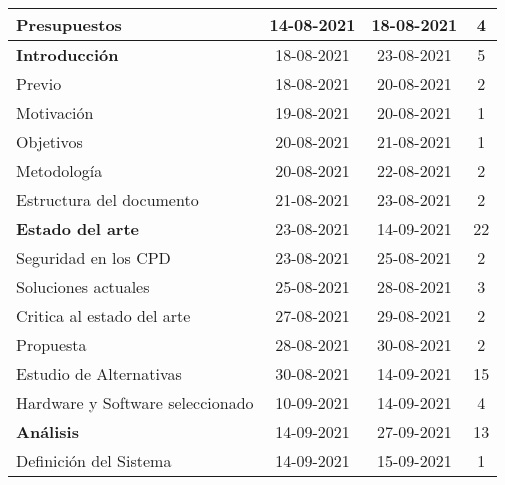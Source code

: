 \begin{longtable}[c]{lcc|c|}
	\multicolumn{1}{|l|}{Presupuestos}                       & \multicolumn{1}{c|}{14-08-2021} & 18-08-2021     & 4   \\ \hline
	\multicolumn{1}{|l|}{\textbf{Introducción}}              & \multicolumn{1}{c|}{18-08-2021} & 23-08-2021     & 5   \\ \hline
	\multicolumn{1}{|l|}{Previo}                             & \multicolumn{1}{c|}{18-08-2021} & 20-08-2021     & 2   \\ \hline
	\multicolumn{1}{|l|}{Motivación}                         & \multicolumn{1}{c|}{19-08-2021} & 20-08-2021     & 1   \\ \hline
	\multicolumn{1}{|l|}{Objetivos}                          & \multicolumn{1}{c|}{20-08-2021} & 21-08-2021     & 1   \\ \hline
	\multicolumn{1}{|l|}{Metodología}                        & \multicolumn{1}{c|}{20-08-2021} & 22-08-2021     & 2   \\ \hline
	\multicolumn{1}{|l|}{Estructura del documento}           & \multicolumn{1}{c|}{21-08-2021} & 23-08-2021     & 2   \\ \hline
	\multicolumn{1}{|l|}{\textbf{Estado del arte}}           & \multicolumn{1}{c|}{23-08-2021} & 14-09-2021     & 22  \\ \hline
	\multicolumn{1}{|l|}{Seguridad en los CPD}               & \multicolumn{1}{c|}{23-08-2021} & 25-08-2021     & 2   \\ \hline
	\multicolumn{1}{|l|}{Soluciones actuales}                & \multicolumn{1}{c|}{25-08-2021} & 28-08-2021     & 3   \\ \hline
	\multicolumn{1}{|l|}{Critica al estado del arte}         & \multicolumn{1}{c|}{27-08-2021} & 29-08-2021     & 2   \\ \hline
	\multicolumn{1}{|l|}{Propuesta}                          & \multicolumn{1}{c|}{28-08-2021} & 30-08-2021     & 2   \\ \hline
	\multicolumn{1}{|l|}{Estudio de Alternativas}            & \multicolumn{1}{c|}{30-08-2021} & 14-09-2021     & 15  \\ \hline
	\multicolumn{1}{|l|}{Hardware y Software   seleccionado} & \multicolumn{1}{c|}{10-09-2021} & 14-09-2021     & 4   \\ \hline
	\multicolumn{1}{|l|}{\textbf{Análisis}}                  & \multicolumn{1}{c|}{14-09-2021} & 27-09-2021     & 13  \\ \hline
	\multicolumn{1}{|l|}{Definición del Sistema}             & \multicolumn{1}{c|}{14-09-2021} & 15-09-2021     & 1   \\ \hline

\end{longtable}

